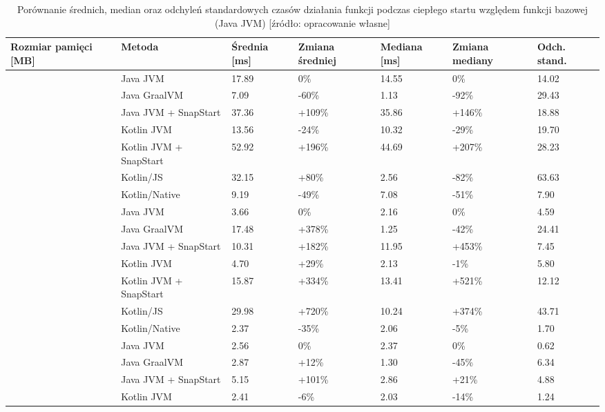 \begin{table}[h!]
\centering
\caption{Porównanie średnich, median oraz odchyleń standardowych czasów działania funkcji podczas ciepłego startu względem funkcji bazowej (Java JVM) [źródło: opracowanie własne]}
\small
\begin{tabular}{|>{\centering\arraybackslash}m{1.5cm}|l|p{1.5cm}|p{1.5cm}|p{1.5cm}|p{1.5cm}|p{1.5cm}|}
\toprule
Rozmiar pamięci [MB] & Metoda & Średnia [ms] & Zmiana średniej & Mediana [ms] & Zmiana mediany & Odch. stand. \\
\midrule
\multirow{7}{*}{128} & Java JVM & 17.89 & \mbox{0\%} & 14.55 & \mbox{0\%} & 14.02 \\
 & Java GraalVM & 7.09 & \mbox{-60\%} & 1.13 & \mbox{-92\%} & 29.43 \\
 & Java JVM + SnapStart & 37.36 & \mbox{+109\%} & 35.86 & \mbox{+146\%} & 18.88 \\
 & Kotlin JVM & 13.56 & \mbox{-24\%} & 10.32 & \mbox{-29\%} & 19.70 \\
 & Kotlin JVM + SnapStart & 52.92 & \mbox{+196\%} & 44.69 & \mbox{+207\%} & 28.23 \\
 & Kotlin/JS & 32.15 & \mbox{+80\%} & 2.56 & \mbox{-82\%} & 63.63 \\
 & Kotlin/Native & 9.19 & \mbox{-49\%} & 7.08 & \mbox{-51\%} & 7.90 \\
\midrule
\multirow{7}{*}{256} & Java JVM & 3.66 & \mbox{0\%} & 2.16 & \mbox{0\%} & 4.59 \\
 & Java GraalVM & 17.48 & \mbox{+378\%} & 1.25 & \mbox{-42\%} & 24.41 \\
 & Java JVM + SnapStart & 10.31 & \mbox{+182\%} & 11.95 & \mbox{+453\%} & 7.45 \\
 & Kotlin JVM & 4.70 & \mbox{+29\%} & 2.13 & \mbox{-1\%} & 5.80 \\
 & Kotlin JVM + SnapStart & 15.87 & \mbox{+334\%} & 13.41 & \mbox{+521\%} & 12.12 \\
 & Kotlin/JS & 29.98 & \mbox{+720\%} & 10.24 & \mbox{+374\%} & 43.71 \\
 & Kotlin/Native & 2.37 & \mbox{-35\%} & 2.06 & \mbox{-5\%} & 1.70 \\
\midrule
\multirow{7}{*}{512} & Java JVM & 2.56 & \mbox{0\%} & 2.37 & \mbox{0\%} & 0.62 \\
 & Java GraalVM & 2.87 & \mbox{+12\%} & 1.30 & \mbox{-45\%} & 6.34 \\
 & Java JVM + SnapStart & 5.15 & \mbox{+101\%} & 2.86 & \mbox{+21\%} & 4.88 \\
 & Kotlin JVM & 2.41 & \mbox{-6\%} & 2.03 & \mbox{-14\%} & 1.24 \\

\end{tabular}
\end{table}
